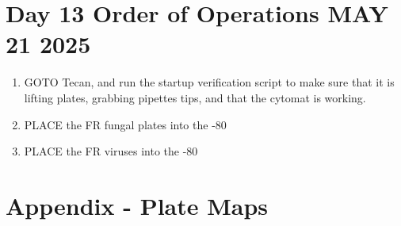 \documentclass{article}
\begin{document}
\section*{Day 13 Order of Operations MAY 21 2025} \label{day8instructions}
\begin{enumerate}
    \item GOTO Tecan, and run the startup verification script to make sure that it is lifting plates, grabbing pipettes tips, and that the cytomat is working. 
    \item PLACE the FR fungal plates into the -80
    \item PLACE the FR viruses into the -80
\end{enumerate}

\section*{Appendix - Plate Maps} \label{platemaps}
\end{document}
